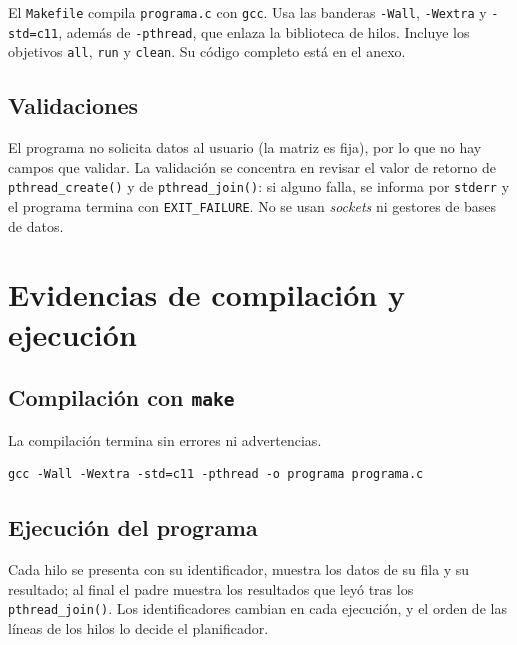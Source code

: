 El \texttt{Makefile} compila \texttt{programa.c} con \texttt{gcc}. Usa las banderas \texttt{-Wall}, \texttt{-Wextra} y \texttt{-std=c11}, además de \texttt{-pthread}, que enlaza la biblioteca de hilos. Incluye los objetivos \texttt{all}, \texttt{run} y \texttt{clean}. Su código completo está en el anexo.

\subsection{Validaciones}
\label{sec:prac03:validaciones}

El programa no solicita datos al usuario (la matriz es fija), por lo que no hay campos que validar. La validación se concentra en revisar el valor de retorno de \texttt{pthread\_create()} y de \texttt{pthread\_join()}: si alguno falla, se informa por \texttt{stderr} y el programa termina con \texttt{EXIT\_FAILURE}. No se usan \emph{sockets} ni gestores de bases de datos.

\section{Evidencias de compilación y ejecución}
\label{sec:prac03:evidencias}

\subsection{Compilación con \texttt{make}}

La compilación termina sin errores ni advertencias.

\begin{lstlisting}[numbers=none, language={}, caption={Compilación con \texttt{make}.}, label={lst:prac03:salida-make}]
gcc -Wall -Wextra -std=c11 -pthread -o programa programa.c
\end{lstlisting}


\subsection{Ejecución del programa}

Cada hilo se presenta con su identificador, muestra los datos de su fila y su resultado; al final el padre muestra los resultados que leyó tras los \texttt{pthread\_join()}. Los identificadores cambian en cada ejecución, y el orden de las líneas de los hilos lo decide el planificador.

